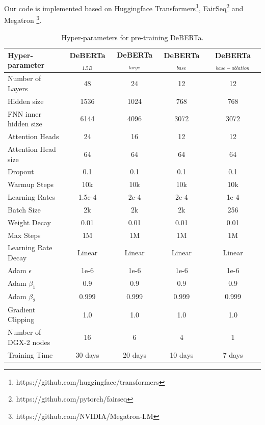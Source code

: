 Our code is implemented based on Huggingface Transformers\footnote{https://github.com/huggingface/transformers}, FairSeq\footnote{https://github.com/pytorch/fairseq} and Megatron \citep{shoeybi2019megatron}\footnote{https://github.com/NVIDIA/Megatron-LM}.

\begin{table}[htb!]
    \centering
    \begin{tabular}{@{\hskip3pt}l@{\hskip2pt}|@{\hskip2pt} c@{\hskip2pt}|@{\hskip2pt} c@{\hskip2pt}|@{\hskip2pt} c@{\hskip2pt}|@{\hskip2pt} c@{\hskip2pt}}
        \toprule
          Hyper-parameter & DeBERTa$_{1.5B}$& DeBERTa$_{large}$ &  DeBERTa$_{base}$ &DeBERTa$_{base-ablation}$\\
        \midrule
        Number of Layers& 48& 24 &12 &12\\
        Hidden size&1536 &1024 &768 &768\\
        FNN inner hidden size & 6144& 4096 & 3072& 3072 \\
        Attention Heads &24 & 16 & 12 & 12\\
        Attention Head size &64 & 64 & 64& 64 \\
        Dropout & 0.1& 0.1 & 0.1& 0.1 \\
        Warmup Steps & 10k & 10k & 10k & 10k\\
        Learning Rates & 1.5e-4& 2e-4& 2e-4& 1e-4 \\
        Batch Size & 2k& 2k & 2k & 256\\
        Weight Decay & 0.01& 0.01 & 0.01& 0.01 \\
        Max Steps & 1M& 1M & 1M & 1M\\
        Learning Rate Decay & Linear& Linear & Linear& Linear \\
        Adam $\epsilon$ & 1e-6& 1e-6 & 1e-6& 1e-6 \\
        Adam $\beta_1$ & 0.9& 0.9 & 0.9& 0.9 \\
        Adam $\beta_2$ & 0.999& 0.999 & 0.999& 0.999 \\
        Gradient Clipping & 1.0& 1.0 & 1.0& 1.0 \\ \hline
        Number of DGX-2 nodes & 16& 6 & 4 &1 \\
        Training Time & 30 days& 20 days & 10 days & 7 days \\
        \bottomrule
        \end{tabular}
    \caption{    Hyper-parameters for pre-training DeBERTa. }
    \label{tbl:hyper-pre-train}
\end{table}

